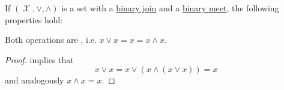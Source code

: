 \begin{proposition}\label{thm:binary_lattice_operations_properties}
  If \( (\mscrX, \vee, \wedge) \) is a set with a \hyperref[def:binary_lattice_operations/join]{binary join} and a \hyperref[def:binary_lattice_operations/meet]{binary meet}, the following properties hold:
  \begin{defenum}
     Both operations are , i.e. \( x \vee x = x = x \wedge x \).
  \end{defenum}
\end{proposition}
\begin{proof}
    implies that
  \begin{equation*}
    x \vee x = x \vee (x \wedge (x \vee x)) = x
  \end{equation*}
  and analogously \( x \wedge x = x \).
\end{proof}

